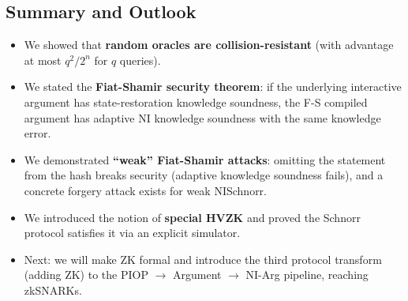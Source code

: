 \documentclass[11pt]{article}
\theoremstyle{plain}
\theoremstyle{definition}
\begin{document}
\subsection{Summary and Outlook}

\begin{itemize}
  \item We showed that \textbf{random oracles are collision-resistant} (with
        advantage at most $q^2/2^n$ for $q$ queries).
  \item We stated the \textbf{Fiat-Shamir security theorem}: if the underlying
        interactive argument has state-restoration knowledge soundness, the F-S
        compiled argument has adaptive NI knowledge soundness with the same
        knowledge error.
  \item We demonstrated \textbf{``weak'' Fiat-Shamir attacks}: omitting the
        statement from the hash breaks security (adaptive knowledge soundness
        fails), and a concrete forgery attack exists for weak NISchnorr.
  \item We introduced the notion of \textbf{special HVZK} and proved the
        Schnorr protocol satisfies it via an explicit simulator.
  \item Next: we will make ZK formal and introduce the third protocol transform
        (adding ZK) to the PIOP $\to$ Argument $\to$ NI-Arg pipeline, reaching
        zkSNARKs.
\end{itemize}
\end{document}
